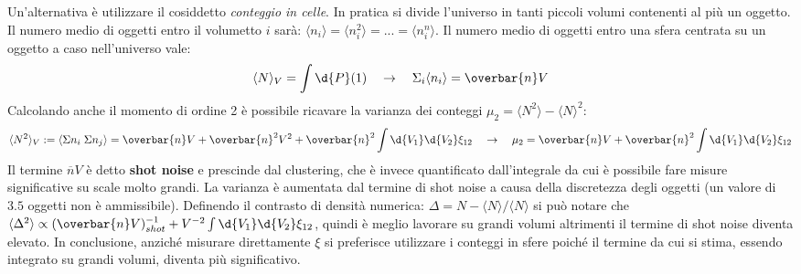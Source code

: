 Un'alternativa è utilizzare il cosiddetto \textit{conteggio in celle}. In pratica si divide l'universo in tanti piccoli volumi contenenti al più un oggetto. Il numero medio di oggetti entro il volumetto $i$ sarà: $\langle n_i\rangle = \langle n_i^2\rangle = ... =\langle n_i^n\rangle$.
Il numero medio di oggetti entro una sfera centrata su un oggetto a caso nell'universo vale:
\begin{equation}
    \langle N\rangle_V = \int \d{P}(1) \quad \to \quad \Sigma_i \langle n_i\rangle = \overbar{n}V
\end{equation}
Calcolando anche il momento di ordine 2 è possibile ricavare la varianza dei conteggi $\mu_2= \langle N^2 \rangle - \langle N \rangle^2 $:
\begin{equation}
    \langle N^2\rangle_V := \langle\Sigma n_i\; \Sigma n_j \rangle =\overbar{n}V+ \overbar{n}^2V^2 + \overbar{n}^2\int \d{V_1}\d{V_2}\xi_{12} \quad \to \quad \mu_2 = \overbar{n}V+ \overbar{n}^2\int \d{V_1}\d{V_2}\xi_{12}
\end{equation}
Il termine $\overbar{n}V$ è detto \textbf{shot noise} e prescinde dal clustering, che è invece quantificato dall'integrale da cui è possibile fare misure significative su scale molto grandi. La varianza è aumentata dal termine di shot noise a causa della discretezza degli oggetti (un valore di $3.5$ oggetti non è ammissibile). Definendo il contrasto di densità numerica: $\Delta = N - \langle N \rangle / \langle N \rangle$ si può notare che $ \langle \Delta^2 \rangle \propto (\overbar{n}V)^{-1}_{shot}+ V^{-2}\int \d{V_1}\d{V_2}\xi_{12}$, quindi è meglio lavorare su grandi volumi altrimenti il termine di shot noise diventa elevato.
In conclusione, anziché misurare direttamente $\xi$ si preferisce utilizzare i conteggi in sfere poiché il termine da cui si stima, essendo integrato su grandi volumi, diventa più significativo.

